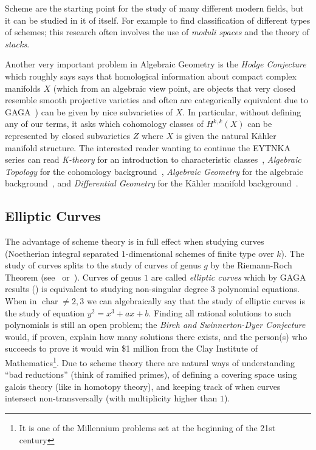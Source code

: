 \documentclass{article}
\newcommand{\Char}{{\operatorname{char}}}
\begin{document}
Scheme are the starting point for the study of many different modern fields, but it can be studied in
it of itself. For example to find classification of different types of schemes; this research often involves the use of
\emph{moduli spaces} and the theory of \emph{stacks}.

Another very important problem in Algebraic Geometry is the \emph{Hodge Conjecture} which roughly says says
that homological information about compact complex manifolds $X$ (which from an algebraic view point, are objects
that very closed resemble smooth projective varieties and often are categorically equivalent due to
GAGA~\cite{hallGAGATheorems2022}) can be given by nice subvarieties of $X$. In particular, without defining
any of our terms, it asks which cohomology classes of $H^{k,k}(X)$ can be represented by closed subvarieties
$Z$ where $X$ is given the natural K\"ahler manifold structure. The interested reader wanting to continue the
EYTNKA series can read \emph{K-theory} for an introduction to characteristic classes~\cite{NateKTheory},
\emph{Algebraic Topology} for the cohomology background~\cite{NateAlgTop}, \emph{Algebraic Geometry} for the
algebraic background~\cite{NateAlgGeo}, and \emph{Differential Geometry} for the K\"ahler manifold
background~\cite{NateDiffGeo}.

\subsection*{Elliptic Curves}

The advantage of scheme theory is in full effect when studying curves (Noetherian integral separated
$1$-dimensional schemes of finite type over $k$). The study of curves splits to
the study of curves of genus $g$ by the Riemann-Roch Theorem (see~\cite{NateComplexAnalysis}
or~\cite{NateAlgGeo}). Curves of genus $1$ are called \emph{elliptic curves} which by GAGA results
(\cite{hallGAGATheorems2022}) is equivalent to studying non-singular degree $3$ polynomial equations. When in
$\Char \ne 2,3$ we can algebraically say that the study of elliptic curves is the study of equation $y^2 = x^3
+ax + b$. Finding all rational solutions to such polynomials is still an open problem; the \emph{Birch
and Swinnerton-Dyer Conjecture} would, if proven, explain how many solutions there exists, and the person(s) who
succeeds to prove it would win \$1 million from the Clay Institute of Mathematics\footnote{It is one of the
Millennium problems set at the beginning of the 21st century}. Due to scheme
theory there are natural ways of understanding ``bad reductions'' (think of ramified primes), of defining
a covering space using galois theory (like in homotopy theory), and keeping track of when curves intersect
non-transversally (with multiplicity higher than $1$).
\end{document}

